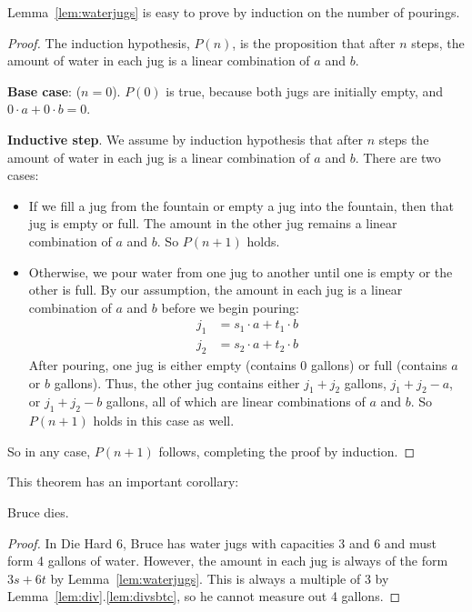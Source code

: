 Lemma~\ref{lem:waterjugs} is easy to prove by induction on the number of
pourings.

\begin{proof}
The induction hypothesis, $P(n)$, is the proposition that after $n$
steps, the amount of water in each jug is a linear combination of $a$
and $b$.

\noindent \textbf{Base case}: ($n = 0$).  $P(0)$ is true, because both jugs are
initially empty, and $0 \cdot a + 0 \cdot b = 0$.

\noindent \textbf{Inductive step}.  We assume by induction hypothesis that
after $n$ steps the amount of water in each jug is a linear combination of
$a$ and $b$.  There are two cases:
%
\begin{itemize}
%
\item If we fill a jug from the fountain or empty a jug into the
fountain, then that jug is empty or full.  The amount in the other jug
remains a linear combination of $a$ and $b$.  So $P(n+1)$ holds.

\item Otherwise, we pour water from one jug to another until one is
empty or the other is full.  By our assumption, the amount in each jug
is a linear combination of $a$ and $b$ before we begin pouring:
%
\begin{align*}
j_1 & = s_1 \cdot a + t_1 \cdot b \\
j_2 & = s_2 \cdot a + t_2 \cdot b
\end{align*}
%
After pouring, one jug is either empty (contains 0 gallons) or full
(contains $a$ or $b$ gallons).  Thus, the other jug contains either
$j_1 + j_2$ gallons, $j_1 + j_2 - a$, or $j_1 + j_2 - b$ gallons, all
of which are linear combinations of $a$ and $b$.  So $P(n+1)$ holds in
this case as well.
\end{itemize}
%
So in any case,  $P(n+1)$ follows, completing the proof by induction.
\end{proof}

This theorem has an important corollary:
\begin{corollary}
Bruce dies.
\end{corollary}

\begin{proof}
In Die Hard 6, Bruce has water jugs with capacities 3 and 6 and must
form 4 gallons of water.  However, the amount in each jug is always of
the form $3s + 6t$ by Lemma~\ref{lem:waterjugs}.  This is always a
multiple of 3 by Lemma~\ref{lem:div}.\ref{lem:divsbtc}, so he cannot
measure out 4 gallons.
\end{proof}

